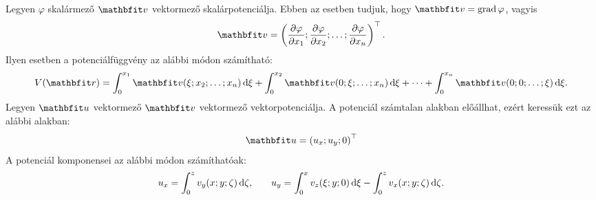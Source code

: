 \documentclass{szb-practice}
\begin{document}
\clearpage
\begin{blueBox}[][nobreak]

  Legyen $\varphi$ skalármező $\rvec v$ vektormező skalárpotenciálja. Ebben
  az esetben tudjuk, hogy $\rvec v = \grad \varphi$, vagyis
  $$
    \rvec v = \left(
    \pdv{\varphi}{x_1};
    \pdv{\varphi}{x_2};
    \dots;
    \pdv{\varphi}{x_n}
    \right)^\T
    \text.
  $$
  Ilyen esetben a potenciálfüggvény az alábbi módon számítható:
  $$
    V(\coordvec)
    = \int_0^{x_1} \rvec v(\xi; x_2; \dots; x_n) \dd \xi
    + \int_0^{x_2} \rvec v(0; \xi; \dots; x_n) \dd \xi
    + \dots
    + \int_0^{x_n} \rvec v(0; 0; \dots; \xi) \dd \xi
    \text.
  $$
  Legyen $\rvec u$ vektormező $\rvec v$ vektormező vektorpotenciálja.
  A potenciál számtalan alakban előállhat, ezért keressük ezt az alábbi alakban:
  $$
    \rvec u = \left( u_x; u_y; 0 \right)^\T
  $$
  A potenciál komponensei az alábbi módon számíthatóak:
  $$
    u_x = \int_0^z v_y(x; y; \zeta) \mathop{}\!\mathrm{d} \zeta
    \text,
    \qquad
    u_y = \int_0^x v_z(\xi; y; 0) \mathop{}\!\mathrm{d} \xi
    - \int_0^z v_x(x; y; \zeta) \mathop{}\!\mathrm{d} \zeta
    \text.
  $$
\end{blueBox}
\end{document}
